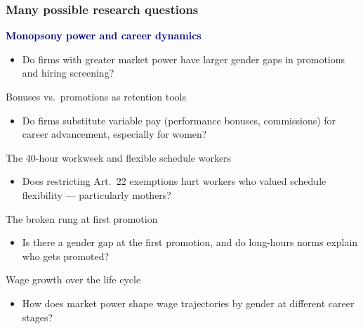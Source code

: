 \documentclass[aspectratio=169, 11pt]{beamer}
\begin{document}
\begin{frame}
\frametitle{Many possible research questions}

\small
\begin{enumerate}\itemsep4pt
    \item \textbf{\textcolor{navy}{Monopsony power and career dynamics}}
    \begin{itemize}
        \item Do firms with greater market power have larger gender gaps in promotions and hiring screening?
    \end{itemize}

    {\color{faded}%
    \item Bonuses vs.\ promotions as retention tools
    \begin{itemize}
        \item Do firms substitute variable pay (performance bonuses, commissions) for career advancement, especially for women?
    \end{itemize}

    \item The 40-hour workweek and flexible schedule workers
    \begin{itemize}
        \item Does restricting Art.\ 22 exemptions hurt workers who valued schedule flexibility --- particularly mothers?
    \end{itemize}

    \item The broken rung at first promotion
    \begin{itemize}
        \item Is there a gender gap at the first promotion, and do long-hours norms explain who gets promoted?
    \end{itemize}

    \item Wage growth over the life cycle
    \begin{itemize}
        \item How does market power shape wage trajectories by gender at different career stages?
    \end{itemize}}
\end{enumerate}

\end{frame}
\end{document}
